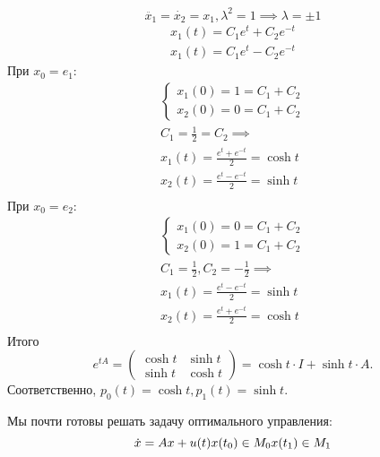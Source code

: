 \begin{exmp}
    \begin{equation*}
        \ddot{x_1} = \dot{x_2} = x_1, \lambda^2 = 1 \implies \lambda = \pm 1
    \end{equation*}
    \begin{gather*}
        x_1(t) = C_1 e^t + C_2 e^{-t} \\
        x_1(t) = C_1 e^t - C_2 e^{-t}
    \end{gather*}
    При $x_0 = e_1$:
    \begin{gather*}
        \begin{cases}
            x_1(0) = 1 = C_1 + C_2 \\
            x_2(0) = 0 = C_1 + C_2 
        \end{cases} \\
        C_1 = \frac{1}{2} = C_2 \implies \\
        x_1(t) = \frac{e^t + e^{-t}}{2} = \cosh t \\
        x_2(t) = \frac{e^t - e^{-t}}{2} = \sinh t \\
    \end{gather*}
    При $x_0 = e_2$:
    \begin{gather*}
        \begin{cases}
            x_1(0) = 0 = C_1 + C_2 \\
            x_2(0) = 1 = C_1 + C_2 
        \end{cases} \\
        C_1 = \frac{1}{2},  C_2 = -\frac{1}{2} \implies \\
        x_1(t) = \frac{e^t - e^{-t}}{2} = \sinh t \\
        x_2(t) = \frac{e^t + e^{-t}}{2} = \cosh t \\
    \end{gather*}
    Итого
    \begin{equation*}
        e^{tA} = \left( \begin{matrix}
            \cosh t & \sinh t \\
            \sinh t & \cosh t
        \end{matrix} \right) = 
        \cosh t \cdot I + \sinh t \cdot A.
    \end{equation*}
    Соответственно, $p_0(t) = \cosh t, p_1(t) = \sinh t$.
\end{exmp}

Мы почти готовы решать задачу оптимального управления:
\begin{equation*}
    \dot{x} = Ax + u(t) \\
    x(t_0) \in M_0 \\
    x(t_1) \in M_1
\end{equation*}

